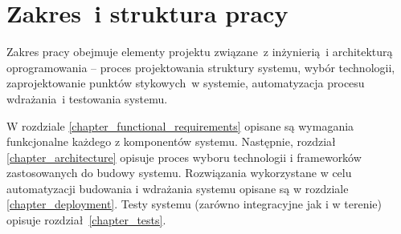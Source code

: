 \section{Zakres~i struktura pracy} \label{intro_scope}

Zakres pracy obejmuje elementy projektu związane~z inżynierią~i architekturą
oprogramowania -- proces projektowania struktury systemu,
wybór technologii, zaprojektowanie punktów stykowych~w systemie, automatyzacja
procesu wdrażania~i testowania systemu.

W rozdziale \ref{chapter_functional_requirements} opisane są wymagania funkcjonalne
każdego z komponentów systemu. Następnie, rozdział \ref{chapter_architecture} opisuje
proces wyboru technologii i frameworków zastosowanych do budowy systemu. 
Rozwiązania wykorzystane w celu automatyzacji budowania i wdrażania systemu opisane
są w rozdziale \ref{chapter_deployment}. Testy systemu (zarówno integracyjne jak
i w terenie) opisuje rozdział~\ref{chapter_tests}.
